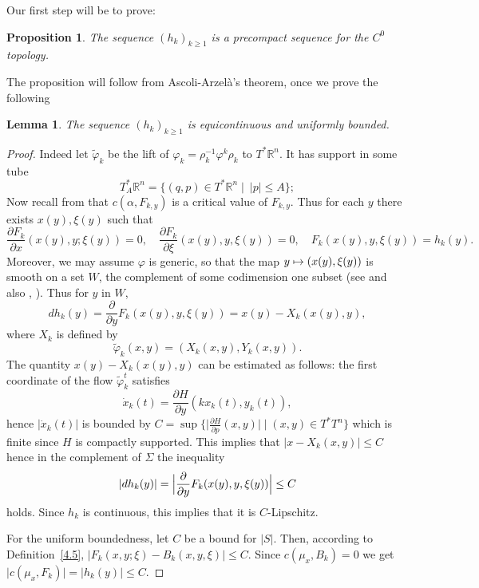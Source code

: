 \documentclass[JEP,XML,SOM,NoFloatCountersInSection,Unicode,published]{cedram}
\newcommand\mto{\mathchoice{\longmapsto}{\mapsto}{\mapsto}{\mapsto}}
\numberwithin{equation}{section}
\theoremstyle{plain}
\newtheorem{lemma}[theorem]{Lemma}
\newtheorem{proposition}[theorem]{Proposition}
\theoremstyle{definition}
\theoremstyle{remark}
\begin{document}
Our first step will be to prove:
\begin{proposition}\label{4.6}
The sequence $({h}_{k})_{k\geq 1}$ is a precompact sequence for the $C^0$ topology.
\end{proposition}
The proposition will follow from Ascoli-Arzelà's
theorem, once we prove the following
\begin{lemma}\label{Lemma-5.10}
The sequence $({h}_{k})_{k\geq 1}$ is equicontinuous and uniformly bounded.
\end{lemma}

\begin{proof}
Indeed let $\widetilde\varphi_k$ be the lift of $\varphi_{k}=\rho^{-1}_{k}
\varphi^{k}\rho_{k}$ to $T^{*}\mathbb{R}^{n}$. It has support in some
tube
\[
T^{*}_{A} \mathbb{R}^{n} =\{ (q,p) \in T^{*}\mathbb{R}^{n} \mid \
\vert p\vert \leq A\};
\]
Now recall from \cite[\S2, p.\,690--693]{Viterbo-STAGGF} that $c(\alpha, F_{k,y})$ is a critical value of $F_{k,y}$. Thus for each $y$ there exists $x(y), \xi(y)$ such that
\[
\frac{\partial {F}_{k}}{\partial x} (x(y),y; \xi(y))=0, \quad
\frac{\partial {F}_{k}}{\partial \xi} (x(y),y,\xi(y))=0,\quad
{F}_{k}(x(y),y,\xi(y)) = {h}_{k}(y).
\]
Moreover, we may assume $\varphi$ is generic, so that the map $y\mto (x(y),\xi(y))$ is
smooth on a set $W$, the complement of some codimension one subset (see \cite{Viterbo-Ottolenghi} and also \cite{Roos, WQ1}, \cite[App.\,2, Th.\,13.1]{NCMT}). Thus for $y$ in $W$,
\[
d {h}_{k}(y) = \frac{\partial}{\partial y} {F}_{k}
(x(y),y, \xi(y))
= x (y) - X_{k} (x(y),y),
\]
where $X_{k}$ is defined by
\[
\widetilde\varphi_{k}(x,y) = (X_{k} (x,y), Y_{k} (x,y)).
\]
The quantity $x(y)-X_{k}(x(y),y)$ can be estimated as follows: the
first coordinate of the flow $\widetilde\varphi_{k}^{t}$ satisfies
\[
\dot{x}_{k}(t)= \frac{\partial H}{\partial y} (k x_{k}(t), y_{k}(t)),
\]
hence $\vert \dot{x}_{k}(t)\vert $ is bounded by $C =\sup\bigl\{ \bigl\vert
\frac{\partial H}{\partial p} (x,y) \bigr \vert \mid (x,y) \in T^{*}T^{n}\bigr\}$ which is finite since $H$ is compactly supported.
This implies that $\vert x - X_{k} (x,y)\vert \leq C$ hence in the complement of $\Sigma$ the inequality
\[
\vert d {h}_{k}(y) \vert= \Bigl \vert \frac{\partial}{\partial y} {F}_{k}
(x(y),y,\xi(y)) \Bigr \vert \leq C
\]
holds. Since ${h}_{k}$ is continuous, this implies that it is $C$-Lipschitz.

For the uniform boundedness, let $C$ be a bound for $ \vert S \vert $. Then, according to Definition~\ref{4.5}, $ \vert F_k(x,y;\xi)-B_k(x,y,\xi)\vert \leq C$. Since $c(\mu_x, B_k)=0$ we get
$ \vert c(\mu_x, F_k) \vert =\vert h_k (y) \vert \leq C$.
\end{proof}
\end{document}
